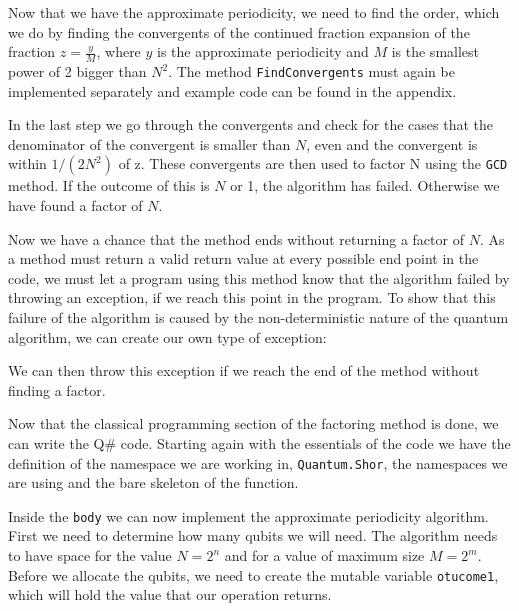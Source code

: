Now that we have the approximate periodicity, we need to find the order, which we do by finding the convergents of the continued fraction expansion of the fraction $z = \frac{y}{M}$, where $y$ is the approximate periodicity and $M$ is the smallest power of 2 bigger than $N^2$. The method \texttt{FindConvergents} must again be implemented separately and example code can be found in the appendix.



In the last step we go through the convergents and check for the cases that the denominator of the convergent is smaller than $N$, even and the convergent is within $1/(2N^2)$ of z. These convergents are then used to factor N using the \texttt{GCD} method. If the outcome of this is $N$ or 1, the algorithm has failed. Otherwise we have found a factor of $N$.



Now we have a chance that the method ends without returning a factor of $N$. As a method must return a valid return value at every possible end point in the code, we must let a program using this method know that the algorithm failed by throwing an exception, if we reach this point in the program. To show that this failure of the algorithm is caused by the non-deterministic nature of the quantum algorithm, we can create our own type of exception:



We can then throw this exception if we reach the end of the method without finding a factor.



Now that the classical programming section of the factoring method is done, we can write the Q\# code.
Starting again with the essentials of the code we have the definition of the namespace we are working in, \texttt{Quantum.Shor}, the namespaces we are using and the bare skeleton of the function.



Inside the \texttt{body} we can now implement the approximate periodicity algorithm. First we need to determine how many qubits we will need. The algorithm needs to have space for the value $N = 2^n$ and for a value of maximum size $M = 2^m$. Before we allocate the qubits, we need to create the mutable variable \texttt{otucome1}, which will hold the value that our operation returns. 

